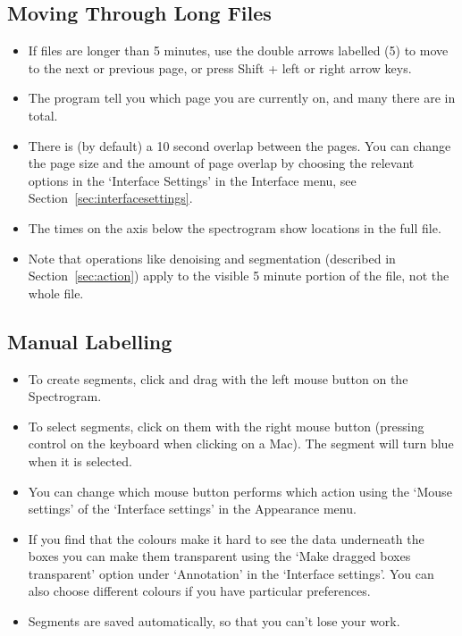\documentclass{article}
\begin{document}
\subsection{Moving Through Long Files}

\begin{itemize}
\item If files are longer than 5 minutes, use the double arrows labelled (5) to move to the next or previous page, or press Shift + left or right arrow keys. 
\item The program tell you which page you are currently on, and many there are in total. 
\item There is (by default) a 10 second overlap between the pages. You can change the page size and the amount of page overlap by choosing the relevant options in the `Interface Settings' in the Interface menu, see Section~\ref{sec:interfacesettings}. 
\item The times on the axis below the spectrogram show locations in the full file.
\item Note that operations like denoising and segmentation (described in Section~\ref{sec:action}) apply to the visible 5 minute portion of the file, not the whole file.
\end{itemize}

\subsection{Manual Labelling}

\begin{itemize}
\item To create segments, click and drag with the left mouse button on the Spectrogram. 
\item To select segments, click on them with the right mouse button (pressing control on the keyboard when clicking on a Mac). The segment will turn blue when it is selected.
\item You can change which mouse button performs which action using the `Mouse settings' of the `Interface settings' in the Appearance menu.
\item If you find that the colours make it hard to see the data underneath the boxes you can make them transparent using the `Make dragged boxes transparent' option under `Annotation' in the `Interface settings'. You can also choose different colours if you have particular preferences.

\item Segments are saved automatically, so that you can't lose your work.

\end{itemize}
\end{document}
